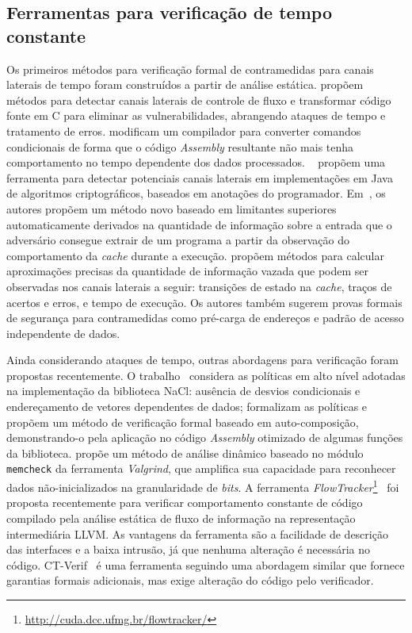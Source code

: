 
\subsection{Ferramentas para verificação de tempo constante}

Os primeiros métodos para verificação formal de contramedidas para canais laterais de tempo foram construídos a partir de análise estática. \cite{MolnarPSW05} propõem métodos para detectar canais laterais de controle de fluxo e transformar código fonte em C para eliminar as vulnerabilidades, abrangendo ataques de tempo e tratamento de erros. \cite{CoppensVBS09} modificam um compilador para converter comandos condicionais de forma que o código \emph{Assembly} resultante não mais tenha comportamento no tempo dependente dos dados processados.
~\cite{LuxS11} propõem uma ferramenta para detectar potenciais canais laterais em implementações em Java de algoritmos criptográficos, baseados em anotações do programador. Em~\cite{KopfMO12}, os autores propõem um método novo baseado em limitantes superiores automaticamente derivados na quantidade de informação sobre a entrada que o adversário consegue extrair de um programa a partir da observação do comportamento da \emph{cache} durante a execução. \cite{DoychevKMR15} propõem métodos para calcular aproximações precisas da quantidade de informação vazada que podem ser observadas nos canais laterais a seguir: transições de estado na \emph{cache}, traços de acertos e erros, e tempo de execução. Os autores também sugerem provas formais de segurança para contramedidas
como pré-carga de endereços e padrão de acesso independente de dados.

Ainda considerando ataques de tempo, outras abordagens para verificação foram propostas recentemente. O trabalho~\cite{AlmeidaBPV13} considera as políticas em alto nível adotadas na implementação da biblioteca NaCl:
ausência de desvios condicionais e endereçamento de vetores dependentes de dados;
formalizam as políticas e propõem um método de verificação formal baseado em auto-composição,
demonstrando-o pela aplicação no código \emph{Assembly} otimizado de algumas funções da biblioteca.
\cite{Langley12} propõe um método de análise dinâmico baseado no módulo \texttt{memcheck} da ferramenta \emph{Valgrind}, que amplifica sua capacidade para
reconhecer dados não-inicializados na granularidade de \emph{bits}. A ferramenta \emph{FlowTracker}\footnote{\url{http://cuda.dcc.ufmg.br/flowtracker/}}~\cite{RodriguesPA16} foi proposta recentemente para verificar comportamento constante de código compilado pela análise estática de fluxo de informação na representação intermediária LLVM. As vantagens da ferramenta são a facilidade de descrição das interfaces e a baixa intrusão, já que nenhuma alteração é necessária no código. CT-Verif~\cite{AlmeidaBBDE16} é uma ferramenta seguindo uma abordagem similar que fornece garantias formais adicionais, mas exige alteração do código pelo verificador.


